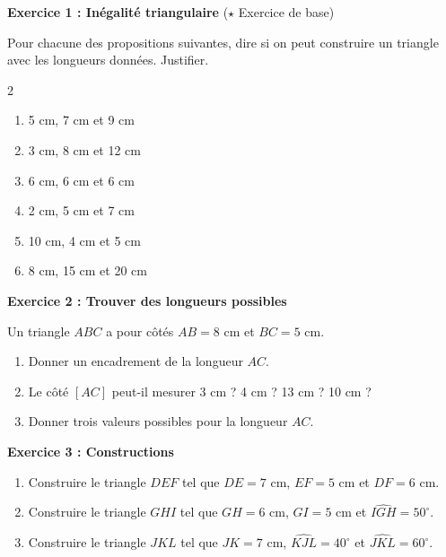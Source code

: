 \begin{exercisebox}
	\textbf{Exercice 1 : Inégalité triangulaire} ($\star$ Exercice de base)

	Pour chacune des propositions suivantes, dire si on peut construire un triangle avec les longueurs données. Justifier.

	\begin{multicols}{2}
		\begin{enumerate}[label=\alph*)]
			\item 5 cm, 7 cm et 9 cm
			\item 3 cm, 8 cm et 12 cm
			\item 6 cm, 6 cm et 6 cm
			\item 2 cm, 5 cm et 7 cm
			\item 10 cm, 4 cm et 5 cm
			\item 8 cm, 15 cm et 20 cm
		\end{enumerate}
	\end{multicols}

	\medskip

	\textbf{Exercice 2 : Trouver des longueurs possibles}

	Un triangle $ABC$ a pour côtés $AB = 8$ cm et $BC = 5$ cm.

	\begin{enumerate}[label=\alph*)]
		\item Donner un encadrement de la longueur $AC$.
		\item Le côté $[AC]$ peut-il mesurer 3 cm ? 4 cm ? 13 cm ? 10 cm ?
		\item Donner trois valeurs possibles pour la longueur $AC$.
	\end{enumerate}

	\medskip

	\textbf{Exercice 3 : Constructions}

	\begin{enumerate}[label=\alph*)]
		\item Construire le triangle $DEF$ tel que $DE = 7$ cm, $EF = 5$ cm et $DF = 6$ cm.
		\item Construire le triangle $GHI$ tel que $GH = 6$ cm, $GI = 5$ cm et $\widehat{IGH} = 50^\circ$.
		\item Construire le triangle $JKL$ tel que $JK = 7$ cm, $\widehat{KJL} = 40^\circ$ et $\widehat{JKL} = 60^\circ$.
	\end{enumerate}
\end{exercisebox}

